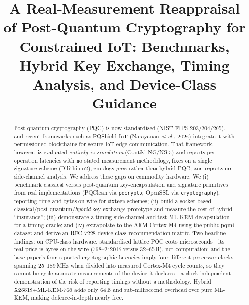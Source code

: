 \documentclass[conference]{IEEEtran}
\begin{document}
\title{A Real-Measurement Reappraisal of Post-Quantum Cryptography for
Constrained IoT: Benchmarks, Hybrid Key Exchange, Timing Analysis, and
Device-Class Guidance}

\author{
}

\maketitle

\begin{abstract}
Post-quantum cryptography (PQC) is now standardised (NIST FIPS 203/204/205),
and recent frameworks such as PQShield-IoT (Narayanan \textit{et al.}, 2026)
integrate it with permissioned blockchains for secure IoT edge communication.
That framework, however, is evaluated \emph{entirely in simulation}
(Contiki-NG/NS-3) and reports per-operation latencies with no stated measurement
methodology, fixes on a single signature scheme (Dilithium2), employs
\emph{pure} rather than hybrid PQC, and reports no side-channel analysis.
We address these gaps on commodity hardware. We (i) benchmark classical
versus post-quantum key-encapsulation and signature primitives from real
implementations (PQClean via \texttt{pqcrypto}; OpenSSL via \texttt{cryptography}),
reporting time and bytes-on-wire for sixteen schemes; (ii) build a socket-based
classical/post-quantum/\emph{hybrid} key-exchange prototype and measure the cost
of hybrid ``insurance''; (iii) demonstrate a timing side-channel and test
ML-KEM decapsulation for a timing oracle; and (iv) extrapolate to the ARM
Cortex-M4 using the public pqm4 dataset and derive an RFC 7228 device-class
recommendation matrix. Two headline findings: on CPU-class hardware,
standardised lattice PQC costs microseconds---its real price is bytes on the
wire (768--2420\,B versus 32--65\,B), not computation; and the base paper's four
reported cryptographic latencies imply four different processor clocks spanning
25--189\,MHz when divided into measured Cortex-M4 cycle counts, so they cannot be
cycle-accurate measurements of the device it declares---a clock-independent
demonstration of the risk of reporting timings without a methodology.
Hybrid X25519+ML-KEM-768 adds only 64\,B and sub-millisecond overhead over pure
ML-KEM, making defence-in-depth nearly free.
\end{abstract}
\end{document}
